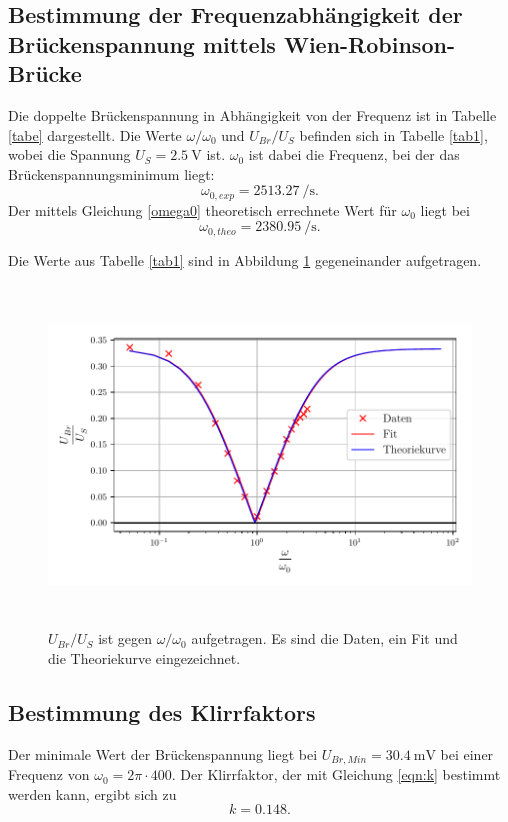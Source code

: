 \subsection{Bestimmung der Frequenzabhängigkeit der Brückenspannung mittels Wien-Robinson-Brücke}
Die doppelte Brückenspannung in Abhängigkeit von der Frequenz ist in Tabelle \ref{tabe} dargestellt.
Die Werte $\omega / \omega_0$ und $U_{Br} / U_S$ befinden sich in Tabelle \ref{tab1}, wobei die Spannung $U_S = \SI{2.5}{\volt}$ ist.
$\omega_0$ ist dabei die Frequenz, bei der das Brückenspannungsminimum liegt:
\begin{equation*}
    \omega_{0,exp} = \SI[per-mode=fraction]{2513.27}{\per\second}.
\end{equation*}
 Der mittels Gleichung \eqref{omega0} theoretisch errechnete Wert für $\omega_0$ liegt bei 
 \begin{equation*}
     \omega_{0,theo} = \SI[per-mode=fraction]{2380.95}{\per\second}.
 \end{equation*}


\noindent Die Werte aus Tabelle \ref{tab1} sind in Abbildung \ref{fig:plot} gegeneinander aufgetragen.
\begin{figure}
 \centering
 \includegraphics[width= 13cm, height= 9cm]{build/plot1.pdf}
 \caption{$U_{Br}/U_S$ ist gegen $\omega / \omega_0$ aufgetragen. Es sind die Daten, ein Fit und die
 Theoriekurve eingezeichnet.}
 \label{fig:plot}
\end{figure}

\subsection{Bestimmung des Klirrfaktors}
Der minimale Wert der Brückenspannung liegt bei $U_{Br,Min} = \SI{30.4}{\milli\volt}$ bei einer Frequenz von 
$\omega_0 = 2 \pi \cdot 400$. 
\newline
Der Klirrfaktor, der mit Gleichung \eqref{eqn:k} bestimmt werden kann, ergibt sich zu
\begin{equation*}
    k = \num{0.148}. %
\end{equation*}
